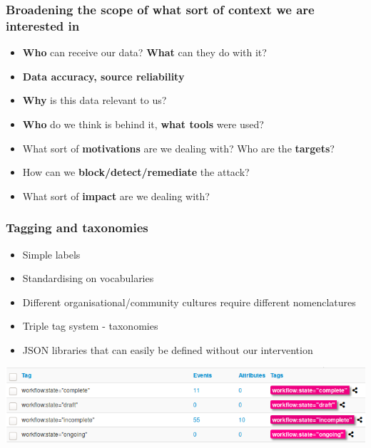 \begin{frame}
\frametitle{Broadening the scope of what sort of context we are interested in}
\begin{itemize}
       \item {\bf Who} can receive our data? {\bf What} can they do with it?
       \item {\bf Data accuracy, source reliability}
       \item {\bf Why} is this data relevant to us?
       \item {\bf Who} do we think is behind it, {\bf what tools} were used?
       \item What sort of {\bf motivations} are we dealing with? Who are the {\bf targets}?
       \item How can we {\bf block/detect/remediate} the attack?
       \item What sort of {\bf impact} are we dealing with?
\end{itemize}
\end{frame}

\begin{frame}
\frametitle{Tagging and taxonomies}
\begin{itemize}
       \item Simple labels
       \item Standardising on vocabularies
       \item Different organisational/community cultures require different nomenclatures
       \item Triple tag system - taxonomies
       \item JSON libraries that can easily be defined without our intervention
\end{itemize}
\includegraphics[width=1.0\linewidth]{taxonomy-workflow.png}
\end{frame}

